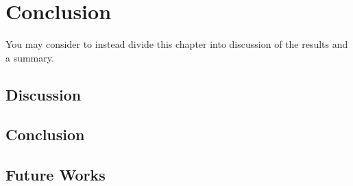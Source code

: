 \chapter{Conclusion}

You may consider to instead divide this chapter into discussion of the results and a summary. 

\section{Discussion}


\section{Conclusion}


\section{Future Works}
